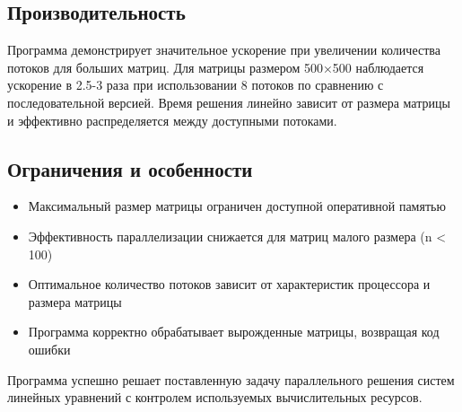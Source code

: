 \subsection{Производительность}

Программа демонстрирует значительное ускорение при увеличении количества потоков для больших матриц. Для матрицы размером 500×500 наблюдается ускорение в 2.5-3 раза при использовании 8 потоков по сравнению с последовательной версией. Время решения линейно зависит от размера матрицы и эффективно распределяется между доступными потоками.

\subsection{Ограничения и особенности}

\begin{itemize}
    \item Максимальный размер матрицы ограничен доступной оперативной памятью
    \item Эффективность параллелизации снижается для матриц малого размера (n < 100)
    \item Оптимальное количество потоков зависит от характеристик процессора и размера матрицы
    \item Программа корректно обрабатывает вырожденные матрицы, возвращая код ошибки
\end{itemize}

Программа успешно решает поставленную задачу параллельного решения систем линейных уравнений с контролем используемых вычислительных ресурсов.